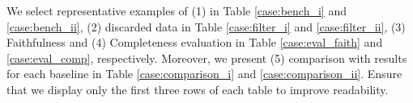 We select representative examples of (1) \bench in Table \ref{case:bench_i} and \ref{case:bench_ii}, (2) discarded data in Table \ref{case:filter_i} and \ref{case:filter_ii}, (3) \eval Faithfulness and (4) Completeness evaluation in Table \ref{case:eval_faith} and \ref{case:eval_comp}, respectively.
Moreover, we present (5) comparison with \eval results for each baseline in Table \ref{case:comparison_i} and \ref{case:comparison_ii}.
Ensure that we display only the first three rows of each table to improve readability.
